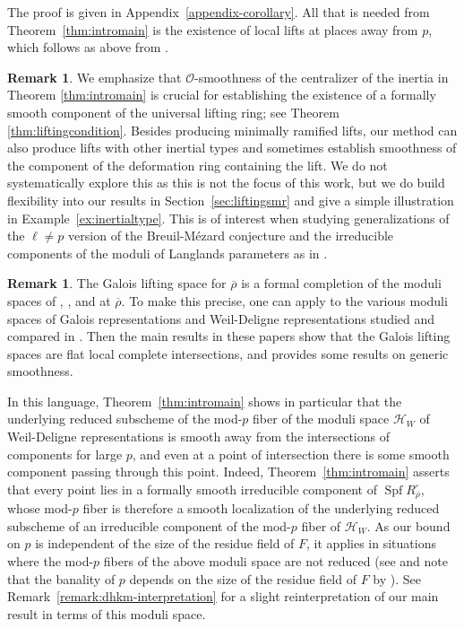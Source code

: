 \documentclass[11pt, letterpaper,english]{amsart}
\theoremstyle{plain}
\theoremstyle{definition}
\newtheorem{remark}[lem]{Remark}
\numberwithin{equation}{section}
\numberwithin{lem}{section}
\newcommand{\cO}{\mathcal{O}}
\newcommand{\sH}{{\mathscr H}}
\newcommand{\rhobar}{{\overline{\rho}}}
\DeclareMathOperator{\Spf}{Spf}
\begin{document}
The proof is given in Appendix~\ref{appendix-corollary}.  
%
All that is needed from Theorem~\ref{thm:intromain} is the existence of local lifts at places away from $p$, which follows as above from \cite{DHKM,Fargues-Scholze,Zhu}.

\begin{remark}
We emphasize that $\cO$-smoothness of the centralizer of the inertia in Theorem \ref{thm:intromain} is crucial for establishing the existence of a formally smooth component of the universal lifting ring; see Theorem \ref{thm:liftingcondition}.
Besides producing minimally ramified lifts, our method can also produce lifts with other inertial types and sometimes establish smoothness of the component of the deformation ring containing the lift.  We do not systematically explore this as this is not the focus of this work, but we do build flexibility into our results in Section~\ref{sec:liftingsmr} and give a simple illustration in Example~\ref{ex:inertialtype}.  This is of interest when studying generalizations of the $\ell \neq p$ version of the Breuil-M\'{e}zard conjecture and the irreducible components of the moduli of Langlands parameters as in \cite{shotton18,shotton20,shotton23}.  
\end{remark}

\begin{remark}\label{remark:intro-moduli}
The Galois lifting space for $\rhobar$ is a formal completion of the moduli spaces of \cite{DHKM}, \cite[\S VIII]{Fargues-Scholze}, and \cite{Zhu} at $\rhobar$.  To make this precise, one can apply \cite[Lemma 2.4.10]{Zhu} to the various moduli spaces of Galois representations and Weil-Deligne representations studied and compared in \cite[\S 3.1]{Zhu}.  Then the main results in these papers show that the Galois lifting spaces are flat local complete intersections, and \cite[\S 5]{DHKM} provides some results on generic smoothness.

In this language, Theorem~\ref{thm:intromain} shows in particular that the underlying reduced subscheme of the mod-$p$ fiber of the moduli space $\sH_W$ of Weil-Deligne representations is smooth away from the intersections of components for large $p$, and even at a point of intersection there is some smooth component passing through this point. Indeed, Theorem~\ref{thm:intromain} asserts that every point lies in a formally smooth irreducible component of $\Spf R_{\rhobar}^{\square}$, whose mod-$p$ fiber is therefore a smooth localization of the underlying reduced subscheme of an irreducible component of the mod-$p$ fiber of $\sH_W$. As our bound on $p$ is independent of the size of the residue field of $F$, it applies in situations where the mod-$p$ fibers of the above moduli space are not reduced (see \cite[Proposition 5.26]{DHKM} and note that the banality of $p$ depends on the size of the residue field of $F$ by \cite[Lemma 5.28]{DHKM}). See Remark~\ref{remark:dhkm-interpretation} for a slight reinterpretation of our main result in terms of this moduli space.
\end{remark}
\end{document}
